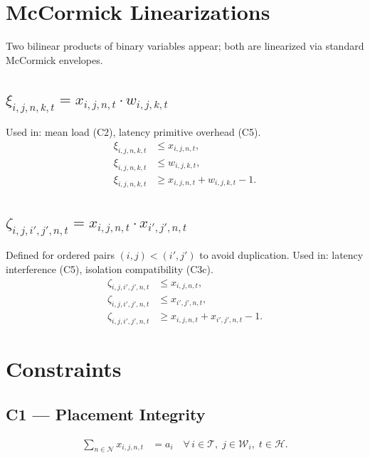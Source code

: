 \documentclass[11pt,a4paper]{article}
\newcommand{\cT}{\mathcal{T}}           %
\newcommand{\cW}{\mathcal{W}}           %
\newcommand{\cN}{\mathcal{N}}           %
\newcommand{\cH}{\mathcal{H}}           %
\begin{document}
\section{McCormick Linearizations}

Two bilinear products of binary variables appear; both are linearized via
standard McCormick envelopes.

\subsection{$\xi_{i,j,n,k,t} = x_{i,j,n,t}\cdot w_{i,j,k,t}$}
Used in: mean load (C2), latency primitive overhead (C5).
\begin{align*}
  \xi_{i,j,n,k,t} &\le x_{i,j,n,t}, \\
  \xi_{i,j,n,k,t} &\le w_{i,j,k,t}, \\
  \xi_{i,j,n,k,t} &\ge x_{i,j,n,t} + w_{i,j,k,t} - 1.
\end{align*}

\subsection{$\zeta_{i,j,i',j',n,t} = x_{i,j,n,t}\cdot x_{i',j',n,t}$}
Defined for ordered pairs $(i,j)<(i',j')$ to avoid duplication.
Used in: latency interference (C5), isolation compatibility (C3c).
\begin{align*}
  \zeta_{i,j,i',j',n,t} &\le x_{i,j,n,t}, \\
  \zeta_{i,j,i',j',n,t} &\le x_{i',j',n,t}, \\
  \zeta_{i,j,i',j',n,t} &\ge x_{i,j,n,t} + x_{i',j',n,t} - 1.
\end{align*}

\section{Constraints}

\subsection{C1 --- Placement Integrity}
\label{c1}

\begin{align}
  \sum_{n\in\cN} x_{i,j,n,t} &= a_i
  \quad \forall\,i\in\cT,\;j\in\cW_i,\;t\in\cH.
  \tag{C1}
\end{align}
\end{document}
